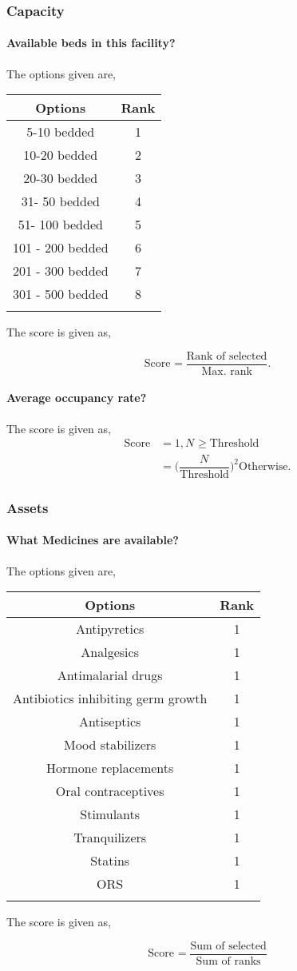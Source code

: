 \documentclass[oneside]{article}
\newcommand{\tsub}[2]{\text{#1}_{\text{#2}}}
\newcommand{\tsubb}[2]{#1_{\text{#2}}}
\newcommand{\dsub}[2]{\dfrac{\text{#1}}{\text{#2}}}
\newcommand{\multsel}[1]
{
	\[
		\tsub{Score}{#1} = \dsub{Sum of selected}{Sum of ranks}
	\]
}
\newcommand{\singsel}[1]
{
	\[
		\tsub{Score}{#1} = \dsub{Rank of selected}{Max. rank}.
	\]
}
\newenvironment{ttable}
{
\begin{center}
\begin{tabular}{c|c}
\hline
}
{
\\ \hline
\end{tabular}
\end{center}
}
\begin{document}
\subsubsection{Capacity}

\paragraph{ Available beds in this facility?}

The options given are,
\begin{ttable}
Options & Rank \\ \hline
5-10 bedded & 1 \\
10-20 bedded & 2 \\
20-30 bedded & 3 \\
31- 50 bedded & 4 \\
51- 100 bedded & 5 \\
101 - 200 bedded & 6 \\
201 - 300 bedded & 7 \\
301 - 500 bedded & 8 \\
\hline
\end{ttable}
The score is given as,
\singsel{}
\paragraph{ Average occupancy rate?}

The score is given as,
\begin{align*}
\tsub{Score}{} &= 1, \tsubb{N}{} \ge \text{Threshold} \\
        &=
\Big(\dfrac{\tsubb{N}{}}{\text{Threshold}}\Big)^{2}
\text{Otherwise}.
\end{align*}
\subsubsection{Assets}

\paragraph{ What Medicines are available?}
The options given are,
\begin{ttable}
Options & Rank \\ \hline
Antipyretics & 1 \\
Analgesics & 1 \\
Antimalarial drugs & 1 \\
Antibiotics inhibiting germ growth & 1 \\
Antiseptics & 1 \\
Mood stabilizers & 1 \\
Hormone replacements & 1 \\
Oral contraceptives & 1 \\
Stimulants & 1 \\
Tranquilizers & 1 \\
Statins & 1 \\
ORS & 1 \\
\hline
\end{ttable}
The score is given as,
\multsel{}
\end{document}
